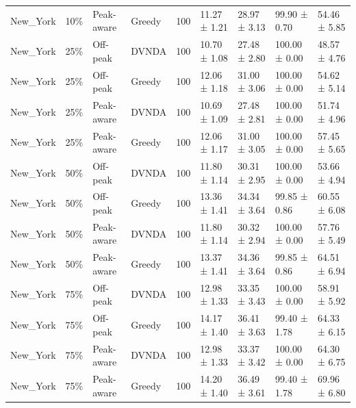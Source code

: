 \begin{tabular}{lllllllll}
New\_York & 10\% & Peak-aware & Greedy & 100 & 11.27 ± 1.21 & 28.97 ± 3.13 & 99.90 ± 0.70 & 54.46 ± 5.85 \\
New\_York & 25\% & Off-peak & DVNDA & 100 & 10.70 ± 1.08 & 27.48 ± 2.80 & 100.00 ± 0.00 & 48.57 ± 4.76 \\
New\_York & 25\% & Off-peak & Greedy & 100 & 12.06 ± 1.18 & 31.00 ± 3.06 & 100.00 ± 0.00 & 54.62 ± 5.14 \\
New\_York & 25\% & Peak-aware & DVNDA & 100 & 10.69 ± 1.09 & 27.48 ± 2.81 & 100.00 ± 0.00 & 51.74 ± 4.96 \\
New\_York & 25\% & Peak-aware & Greedy & 100 & 12.06 ± 1.17 & 31.00 ± 3.05 & 100.00 ± 0.00 & 57.45 ± 5.65 \\
New\_York & 50\% & Off-peak & DVNDA & 100 & 11.80 ± 1.14 & 30.31 ± 2.95 & 100.00 ± 0.00 & 53.66 ± 4.94 \\
New\_York & 50\% & Off-peak & Greedy & 100 & 13.36 ± 1.41 & 34.34 ± 3.64 & 99.85 ± 0.86 & 60.55 ± 6.08 \\
New\_York & 50\% & Peak-aware & DVNDA & 100 & 11.80 ± 1.14 & 30.32 ± 2.94 & 100.00 ± 0.00 & 57.76 ± 5.49 \\
New\_York & 50\% & Peak-aware & Greedy & 100 & 13.37 ± 1.41 & 34.36 ± 3.64 & 99.85 ± 0.86 & 64.51 ± 6.94 \\
New\_York & 75\% & Off-peak & DVNDA & 100 & 12.98 ± 1.33 & 33.35 ± 3.43 & 100.00 ± 0.00 & 58.91 ± 5.92 \\
New\_York & 75\% & Off-peak & Greedy & 100 & 14.17 ± 1.40 & 36.41 ± 3.63 & 99.40 ± 1.78 & 64.33 ± 6.15 \\
New\_York & 75\% & Peak-aware & DVNDA & 100 & 12.98 ± 1.33 & 33.37 ± 3.42 & 100.00 ± 0.00 & 64.30 ± 6.75 \\
New\_York & 75\% & Peak-aware & Greedy & 100 & 14.20 ± 1.40 & 36.49 ± 3.61 & 99.40 ± 1.78 & 69.96 ± 6.80 \\
\hline
\end{tabular}
